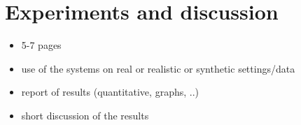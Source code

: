 \section{Experiments and discussion}
\label{sec:experiments}

\begin{itemize} 
    \item 5-7 pages
    \item use of the systems on real or realistic or synthetic settings/data
    \item report of results (quantitative, graphs, ..)
    \item short discussion of the results 
\end{itemize}
